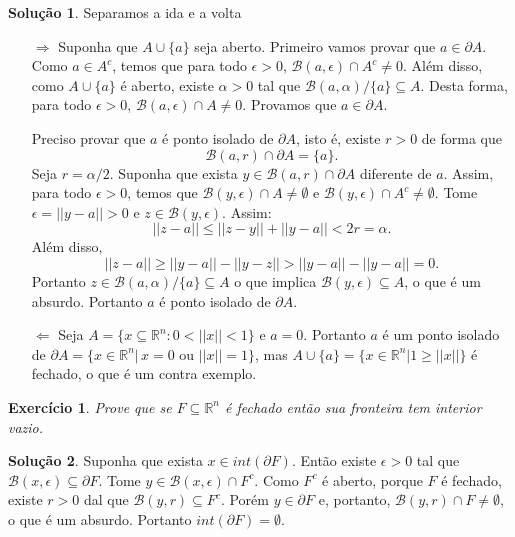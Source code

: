 \documentclass[a4paper,12pt]{article}
\newcommand{\R}{\mathbb{R}}
\newcommand{\B}{\mathcal{B}}
\theoremstyle{exer}
\newtheorem{exercise}{Exercício}
\theoremstyle{definition}
\newtheorem{solution}{Solução}
\theoremstyle{plain}
\begin{document}
\begin{solution}
    Separamos a ida e a volta
    \begin{enumerate}
        \item[$\Rightarrow$] Suponha que $A \cup \{a\}$ seja aberto. Primeiro
        vamos provar que $a \in \partial A$. Como $a \in A^c$, temos que para
        todo $\epsilon > 0$, $\B(a, \epsilon) \cap A^c \neq 0$. Além disso,
        como $A \cup \{a\}$ é aberto, existe $\alpha > 0$ tal que
        $\B(a,\alpha)/\{a\} \subseteq A$. Desta forma, para todo $\epsilon >
        0$, $\B(a, \epsilon) \cap A \neq 0$. Provamos que $a \in \partial A$. 
        
        Preciso provar que $a$ é ponto isolado de $\partial A$, isto é,
        existe $r > 0$ de forma que
        $$\B(a,r) \cap \partial A = \{a\}.$$ 
        Seja $r = \alpha/2$. Suponha que exista $y \in \B(a, r) \cap \partial
        A$ diferente de $a$. Assim, para todo $\epsilon > 0$, temos que
        $\B(y,\epsilon) \cap A \neq \emptyset$ e $\B(y, \epsilon) \cap A^c
        \neq \emptyset$. Tome $\epsilon = ||y - a||>0$ e $z \in
        \B(y,\epsilon)$. Assim:
        $$
        ||z - a|| \le ||z - y|| + ||y - a|| < 2r = \alpha.
        $$
        Além disso,
        $$
        ||z - a|| \ge ||y-a|| - ||y-z|| > ||y - a|| - ||y-a|| = 0.
        $$
        Portanto $z \in \B(a,\alpha)/\{a\} \subseteq A$ o que implica
        $\B(y,\epsilon) \subseteq A$, o que é um absurdo. Portanto $a$ é ponto
        isolado de $\partial A$.
        \item[$\Leftarrow$] Seja $A = \{x \subseteq \R^n : 0 < ||x|| < 1\}$ e
        $a = 0$. Portanto $a$ é um ponto isolado de $\partial A = \{x \in \R^n
        |\, x = 0 \text{ ou } ||x|| = 1\}$, mas $A \cup \{a\} = \{x \in \R^n |
        1 \ge ||x||\}$ é fechado, o que é um contra exemplo. 
    \end{enumerate}
\end{solution}

\begin{exercise}
    Prove que se $F \subseteq \R^n$ é fechado então sua fronteira tem interior vazio.
\end{exercise}

\begin{solution}
    Suponha que exista $x \in int(\partial F)$. Então existe $\epsilon > 0$
    tal que $\B(x,\epsilon) \subseteq \partial F$. Tome $y \in \B(x,\epsilon)
    \cap F^c$. Como $F^c$ é aberto, porque $F$ é fechado, existe $r > 0$ dal
    que $\B(y,r) \subseteq F^c$. Porém $y \in \partial F$ e, portanto,
    $\B(y,r) \cap F \neq \emptyset$, o que é um absurdo. Portanto
    $int(\partial F) = \emptyset$. 
\end{solution}
\end{document}
